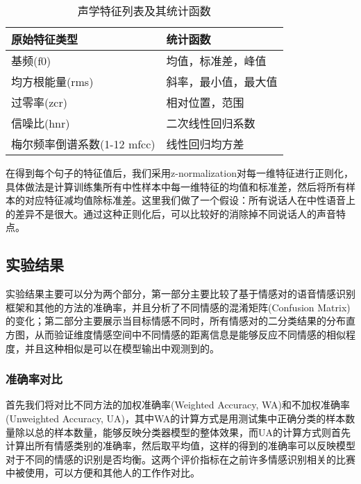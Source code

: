\begin{table}[htb]
\centering
\begin{minipage}[t]{0.8\linewidth} %
\caption{声学特征列表及其统计函数}
\label{tab:acoustic_feature}
    \begin{tabularx}{\linewidth}{X<{\centering} X<{\centering}}
        \toprule[1.5pt]
        原始特征类型 & 统计函数 \\
        \midrule[1pt]
        基频(f0) & 均值，标准差，峰值 \\
        均方根能量(rms) & 斜率，最小值，最大值 \\
        过零率(zcr) & 相对位置，范围 \\
        信噪比(hnr) & 二次线性回归系数 \\
        梅尔频率倒谱系数(1-12 mfcc) & 线性回归均方差 \\
        \bottomrule[1.5pt]
    \end{tabularx}
\end{minipage}
\end{table}

在得到每个句子的特征值后，我们采用z-normalization对每一维特征进行正则化，具体做法是计算训练集所有中性样本中每一维特征的均值和标准差，然后将所有样本的对应特征减均值除标准差。这里我们做了一个假设：所有说话人在中性语音上的差异不是很大。通过这种正则化后，可以比较好的消除掉不同说话人的声音特点。

\subsection{实验结果}
\label{ssec:experiment_result}

实验结果主要可以分为两个部分，第一部分主要比较了基于情感对的语音情感识别框架和其他的方法的准确率，并且分析了不同情感的混淆矩阵(Confusion Matrix)的变化；第二部分主要展示当目标情感不同时，所有情感对的二分类结果的分布直方图，从而验证维度情感空间中不同情感的距离信息是能够反应不同情感的相似程度，并且这种相似是可以在模型输出中观测到的。

\subsubsection{准确率对比}
\label{sssec:emo_pair_acc_compare}

首先我们将对比不同方法的加权准确率(Weighted Accuracy, WA)和不加权准确率(Unweighted Accuracy, UA)，其中WA的计算方式是用测试集中正确分类的样本数量除以总的样本数量，能够反映分类器模型的整体效果，而UA的计算方式则首先计算出所有情感类别的准确率，然后取平均值，这样的得到的准确率可以反映模型对于不同的情感的识别是否均衡。这两个评价指标在之前许多情感识别相关的比赛中被使用，可以方便和其他人的工作作对比。

